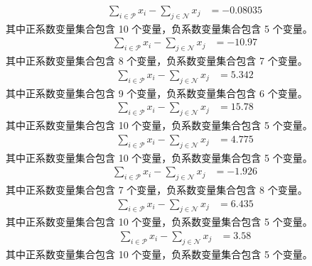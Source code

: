 \documentclass[a4paper,11pt]{article}
\begin{document}
\begin{align}
\sum_{i \in \mathcal{P}} x_i - \sum_{j \in \mathcal{N}} x_j &= -0.08035 \nonumber
\end{align}
其中正系数变量集合包含 10 个变量，负系数变量集合包含 5 个变量。\\[0.3em]

\begin{align}
\sum_{i \in \mathcal{P}} x_i - \sum_{j \in \mathcal{N}} x_j &= -10.97 \nonumber
\end{align}
其中正系数变量集合包含 8 个变量，负系数变量集合包含 7 个变量。\\[0.3em]

\begin{align}
\sum_{i \in \mathcal{P}} x_i - \sum_{j \in \mathcal{N}} x_j &= 5.342 \nonumber
\end{align}
其中正系数变量集合包含 9 个变量，负系数变量集合包含 6 个变量。\\[0.3em]

\begin{align}
\sum_{i \in \mathcal{P}} x_i - \sum_{j \in \mathcal{N}} x_j &= 15.78 \nonumber
\end{align}
其中正系数变量集合包含 10 个变量，负系数变量集合包含 5 个变量。\\[0.3em]

\begin{align}
\sum_{i \in \mathcal{P}} x_i - \sum_{j \in \mathcal{N}} x_j &= 4.775 \nonumber
\end{align}
其中正系数变量集合包含 10 个变量，负系数变量集合包含 5 个变量。\\[0.3em]

\begin{align}
\sum_{i \in \mathcal{P}} x_i - \sum_{j \in \mathcal{N}} x_j &= -1.926 \nonumber
\end{align}
其中正系数变量集合包含 7 个变量，负系数变量集合包含 8 个变量。\\[0.3em]

\begin{align}
\sum_{i \in \mathcal{P}} x_i - \sum_{j \in \mathcal{N}} x_j &= 6.435 \nonumber
\end{align}
其中正系数变量集合包含 10 个变量，负系数变量集合包含 5 个变量。\\[0.3em]

\begin{align}
\sum_{i \in \mathcal{P}} x_i - \sum_{j \in \mathcal{N}} x_j &= 3.58 \nonumber
\end{align}
其中正系数变量集合包含 10 个变量，负系数变量集合包含 5 个变量。\\[0.3em]
\end{document}

